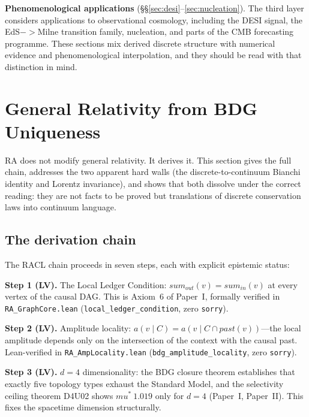 \documentclass[11pt]{article}
\def\mu{mu}%
\def\mathrm#1{#1}%
\def\approx{~}%
\def\to{->}%
\def\sum{sum}%
\begin{document}
\textbf{Phenomenological applications} (\S\S\ref{sec:desi}--\ref{sec:nucleation}). The third layer considers applications to observational cosmology, including the DESI signal, the EdS$\to$Milne transition family, nucleation, and parts of the CMB forecasting programme. These sections mix derived discrete structure with numerical evidence and phenomenological interpolation, and they should be read with that distinction in mind.

\section{General Relativity from BDG Uniqueness}
\label{sec:gr}

RA does not modify general relativity. It derives it. This section gives the full chain, addresses the two apparent hard walls (the discrete-to-continuum Bianchi identity and Lorentz invariance), and shows that both dissolve under the correct reading: they are not facts to be proved but translations of discrete conservation laws into continuum language.

\subsection{The derivation chain}
\label{sec:gr_chain}

The RACL chain proceeds in seven steps, each with explicit epistemic status:

\textbf{Step 1 (LV).} The Local Ledger Condition: $\sum_{\mathrm{out}}(v) = \sum_{\mathrm{in}}(v)$ at every vertex of the causal DAG. This is Axiom~6 of Paper~I, formally verified in \texttt{RA\_GraphCore.lean} (\texttt{local\_ledger\_condition}, zero \texttt{sorry}).

\textbf{Step 2 (LV).} Amplitude locality: $a(v \mid C) = a(v \mid C \cap \mathrm{past}(v))$---the local amplitude depends only on the intersection of the context with the causal past. Lean-verified in \texttt{RA\_AmpLocality.lean} (\texttt{bdg\_amplitude\_locality}, zero \texttt{sorry}).

\textbf{Step 3 (LV).} $d=4$ dimensionality: the BDG closure theorem establishes that exactly five topology types exhaust the Standard Model, and the selectivity ceiling theorem D4U02 shows $\mu^* \approx 1.019$ only for $d=4$ (Paper~I, Paper~II). This fixes the spacetime dimension structurally.
\end{document}
